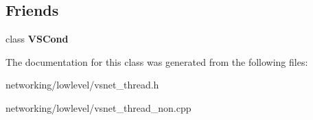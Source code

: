 \subsection*{Friends}
\begin{DoxyCompactItemize}
\item 
class {\bfseries V\+S\+Cond}\hypertarget{classVSMutex_ab71a63435aeba939a83b6e009efabe3c}{}\label{classVSMutex_ab71a63435aeba939a83b6e009efabe3c}

\end{DoxyCompactItemize}


The documentation for this class was generated from the following files\+:\begin{DoxyCompactItemize}
\item 
networking/lowlevel/vsnet\+\_\+thread.\+h\item 
networking/lowlevel/vsnet\+\_\+thread\+\_\+non.\+cpp\end{DoxyCompactItemize}
